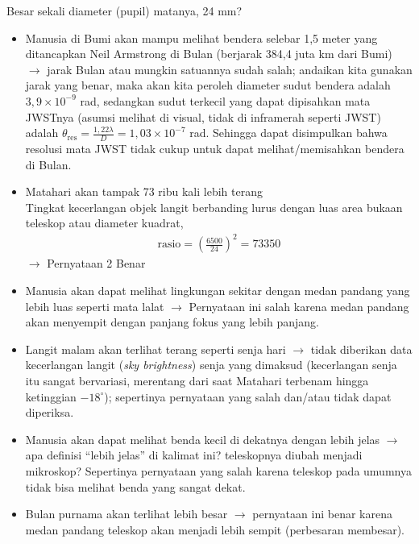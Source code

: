 \documentclass[11pt,fleqn]{exam}
\begin{document}
\begin{questions}
Besar sekali diameter (pupil) matanya, 24 mm?
\begin{itemize}
    \item Manusia di Bumi akan mampu melihat bendera selebar 1,5 meter yang ditancapkan Neil Armstrong di Bulan (berjarak 384,4 juta km dari Bumi) $\rightarrow$ jarak Bulan atau mungkin satuannya sudah salah; andaikan kita gunakan jarak yang benar, maka akan kita peroleh diameter sudut bendera adalah $3,9 \times 10^{-9}$ rad, sedangkan sudut terkecil yang dapat dipisahkan mata JWSTnya (asumsi melihat di visual, tidak di inframerah seperti JWST) adalah $\theta_\text{res} = \frac{1,22 \lambda}{D} = 1,03 \times 10^{-7}$ rad. Sehingga dapat disimpulkan bahwa resolusi mata JWST tidak cukup untuk dapat melihat/memisahkan bendera di Bulan.
    \item Matahari akan tampak 73 ribu kali lebih terang\\
    Tingkat kecerlangan objek langit berbanding lurus dengan luas area bukaan teleskop atau diameter kuadrat,
    \begin{eqnarray*}
        \text{rasio} = \left(\frac{6500}{24}\right)^2 = 73350
    \end{eqnarray*}
    $\rightarrow$ Pernyataan 2 Benar
    \item Manusia akan dapat melihat lingkungan sekitar dengan medan pandang yang lebih luas seperti mata lalat $\rightarrow$ Pernyataan ini salah karena medan pandang akan menyempit dengan panjang fokus yang lebih panjang.
    \item Langit malam akan terlihat terang seperti senja hari $\rightarrow$ tidak diberikan data kecerlangan langit (\textit{sky brightness}) senja yang dimaksud (kecerlangan senja itu sangat bervariasi, merentang dari saat Matahari terbenam hingga ketinggian $-18^{\circ}$); sepertinya pernyataan yang salah dan/atau tidak dapat diperiksa.
    \item Manusia akan dapat melihat benda kecil di dekatnya dengan lebih jelas $\rightarrow$ apa definisi ``lebih jelas'' di kalimat ini? teleskopnya diubah menjadi mikroskop? Sepertinya pernyataan yang salah karena teleskop pada umumnya tidak bisa melihat benda yang sangat dekat.
    \item Bulan purnama akan terlihat lebih besar $\rightarrow$ pernyataan ini benar karena medan pandang teleskop akan menjadi lebih sempit (perbesaran membesar).
\end{itemize}


\end{questions}
\end{document}
